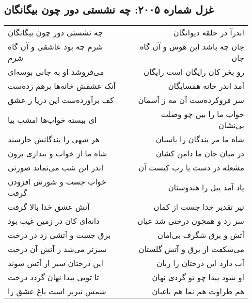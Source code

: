 \begin{center}
\section*{غزل شماره ۲۰۰۵: چه نشستی دور چون بیگانگان}
\label{sec:2005}
\begin{longtable}{l p{0.5cm} r}
چه نشستی دور چون بیگانگان
&&
اندرآ در حلقه دیوانگان
\\
شرم چه بود عاشقی و آن گاه شرم
&&
جان چه باشد این هوس و آن گاه جان
\\
می‌فروشد او به جانی بوسه‌ای
&&
رو بخر کان رایگان است رایگان
\\
آنک عشقش خانه‌ها برهم زده‌ست
&&
آمد اندر خانه همسایگان
\\
کف برآورده‌ست این دریا ز عشق
&&
سر فروکرده‌ست آن مه ز آسمان
\\
ای ببسته خواب‌ها امشب بیا
&&
خواب ما را بین چو وصلت بی‌نشان
\\
هر شهی را بندگانش حارسند
&&
شاه ما مر بندگان را پاسبان
\\
شاه ما از خواب و بیداری برون
&&
در میان جان ما دامن کشان
\\
اندر این شب می‌نماید صورتی
&&
مشعله در دست یا رب کیست آن
\\
خواب جست و شورش افزودن گرفت
&&
یاد آمد پیل را هندوستان
\\
آتش عشق خدا بالا گرفت
&&
تیر تقدیر خدا جست از کمان
\\
دانه‌ای کان در زمین غیب بود
&&
سر زد و همچون درختی شد عیان
\\
برق جست و آتشی زد در درخت
&&
آتش و برق شگرف بی‌امان
\\
سبزتر می‌شد ز آتش آن درخت
&&
می‌شکفت از برق و آتش گلستان
\\
این درختان سبز از آتش شوند
&&
آب دارد این درختان را زبان
\\
تا تویی پیدا نهان گردد درخت
&&
او شود پیدا چو تو گردی نهان
\\
شمس تبریز است باغ عشق را
&&
هم طراوت هم نما هم باغبان
\\
\end{longtable}
\end{center}
